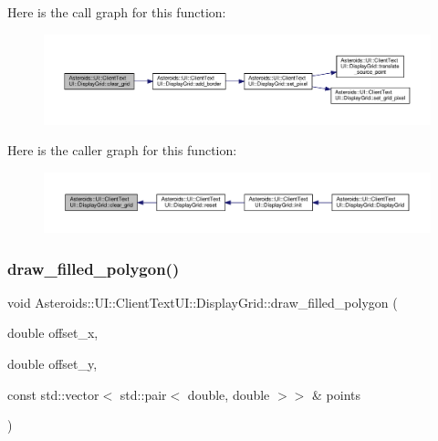 Here is the call graph for this function\+:\nopagebreak
\begin{figure}[H]
\begin{center}
\leavevmode
\includegraphics[width=350pt]{classAsteroids_1_1UI_1_1ClientTextUI_1_1DisplayGrid_aa5b4f98a3eae7f672021228e5f484f54_cgraph}
\end{center}
\end{figure}
Here is the caller graph for this function\+:\nopagebreak
\begin{figure}[H]
\begin{center}
\leavevmode
\includegraphics[width=350pt]{classAsteroids_1_1UI_1_1ClientTextUI_1_1DisplayGrid_aa5b4f98a3eae7f672021228e5f484f54_icgraph}
\end{center}
\end{figure}
\mbox{\label{classAsteroids_1_1UI_1_1ClientTextUI_1_1DisplayGrid_a54cc7e12266f854d8047e99b7f547f22}} 
\subsubsection{\texorpdfstring{draw\+\_\+filled\+\_\+polygon()}{draw\_filled\_polygon()}}
{\footnotesize\ttfamily void Asteroids\+::\+U\+I\+::\+Client\+Text\+U\+I\+::\+Display\+Grid\+::draw\+\_\+filled\+\_\+polygon (\begin{DoxyParamCaption}\item[{double}]{offset\+\_\+x,  }\item[{double}]{offset\+\_\+y,  }\item[{const std\+::vector$<$ std\+::pair$<$ double, double $>$$>$ \&}]{points }\end{DoxyParamCaption})}



